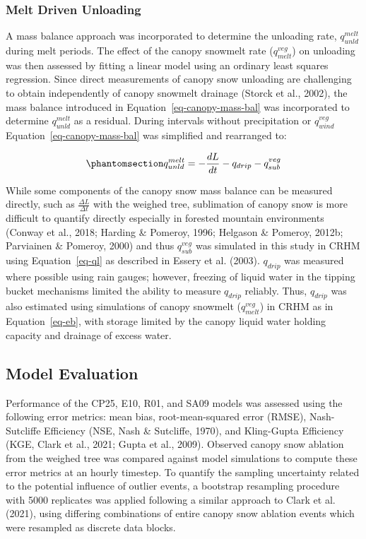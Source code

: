 \documentclass[
]{agujournal2019}
\begin{document}
\subsubsection{Melt Driven Unloading}\label{melt-driven-unloading}

A mass balance approach was incorporated to determine the unloading
rate, \(q_{unld}^{melt}\) during melt periods. The effect of the canopy
snowmelt rate (\(q_{melt}^{veg}\)) on unloading was then assessed by
fitting a linear model using an ordinary least squares regression. Since
direct measurements of canopy snow unloading are challenging to obtain
independently of canopy snowmelt drainage (Storck et al., 2002), the
mass balance introduced in Equation~\ref{eq-canopy-mass-bal} was
incorporated to determine \(q_{unld}^{melt}\) as a residual. During
intervals without precipitation or \(q_{wind}^{veg}\)
Equation~\ref{eq-canopy-mass-bal} was simplified and rearranged to:

\begin{equation}\phantomsection\label{eq-unld-melt-mass-bal}{
q_{unld}^{melt} = -\frac{dL}{dt} - q_{drip} - q_{sub}^{veg}
}\end{equation}

While some components of the canopy snow mass balance can be measured
directly, such as \(\frac{\Delta L}{\Delta t}\) with the weighed tree,
sublimation of canopy snow is more difficult to quantify directly
especially in forested mountain environments (Conway et al., 2018;
Harding \& Pomeroy, 1996; Helgason \& Pomeroy, 2012b; Parviainen \&
Pomeroy, 2000) and thus \(q_{sub}^{veg}\) was simulated in this study in
CRHM using Equation~\ref{eq-ql} as described in Essery et al. (2003).
\(q_{drip}\) was measured where possible using rain gauges; however,
freezing of liquid water in the tipping bucket mechanisms limited the
ability to measure \(q_{drip}\) reliably. Thus, \(q_{drip}\) was also
estimated using simulations of canopy snowmelt (\(q_{melt}^{veg}\)) in
CRHM as in Equation~\ref{eq-eb}, with storage limited by the canopy
liquid water holding capacity and drainage of excess water.

\subsection{Model Evaluation}\label{model-evaluation}

Performance of the CP25, E10, R01, and SA09 models was assessed using
the following error metrics: mean bias, root-mean-squared error (RMSE),
Nash-Sutcliffe Efficiency (NSE, Nash \& Sutcliffe, 1970), and
Kling-Gupta Efficiency (KGE, Clark et al., 2021; Gupta et al., 2009).
Observed canopy snow ablation from the weighed tree was compared against
model simulations to compute these error metrics at an hourly timestep.
To quantify the sampling uncertainty related to the potential influence
of outlier events, a bootstrap resampling procedure with 5000 replicates
was applied following a similar approach to Clark et al. (2021), using
differing combinations of entire canopy snow ablation events which were
resampled as discrete data blocks.
\end{document}

